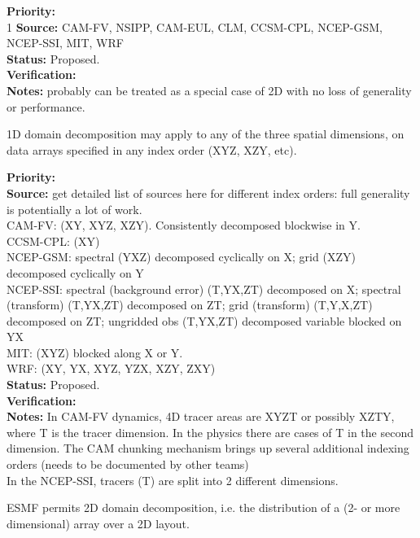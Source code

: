\begin{reqlist}
{\bf Priority:} \\ 1
{\bf Source:} CAM-FV, NSIPP, CAM-EUL, CLM, CCSM-CPL, NCEP-GSM, NCEP-SSI, MIT, WRF \\
{\bf Status:} Proposed. \\
{\bf Verification:} \\
{\bf Notes:} probably can be treated as a special case of 2D with no
  loss of generality or performance.
\end{reqlist}


1D domain decomposition may apply to any of the three spatial
dimensions, on data arrays specified in any index order (XYZ, XZY,
etc).

\begin{reqlist}
{\bf Priority:} \\
{\bf Source:} get detailed list of sources here for different index
  orders: full generality is potentially a lot of work. \\
 CAM-FV: (XY, XYZ, XZY).  Consistently decomposed blockwise in Y. \\
 CCSM-CPL: (XY) \\
 NCEP-GSM: spectral (YXZ) decomposed cyclically on X;
           grid (XZY) decomposed cyclically on Y \\
 NCEP-SSI: spectral (background error) (T,YX,ZT) decomposed on X;
           spectral (transform) (T,YX,ZT) decomposed on ZT;
           grid (transform) (T,Y,X,ZT) decomposed on ZT;
           ungridded obs (T,YX,ZT) decomposed variable blocked on YX \\
 MIT: (XYZ) blocked along X or Y. \\
 WRF: (XY, YX, XYZ, YZX, XZY, ZXY) \\
{\bf Status:} Proposed. \\
{\bf Verification:} \\
{\bf Notes:}  In CAM-FV dynamics, 4D tracer areas are XYZT or
	possibly XZTY, where T is the tracer dimension.  In the physics
	there are cases of T in the second dimension.  The CAM
	chunking mechanism brings up several additional indexing
	orders (needs to be documented by other teams) \\
        In the NCEP-SSI, tracers (T) are split into 2 different dimensions. 
\end{reqlist}


ESMF permits 2D domain decomposition, i.e. the distribution of a
(2- or more dimensional) array over a 2D layout.

